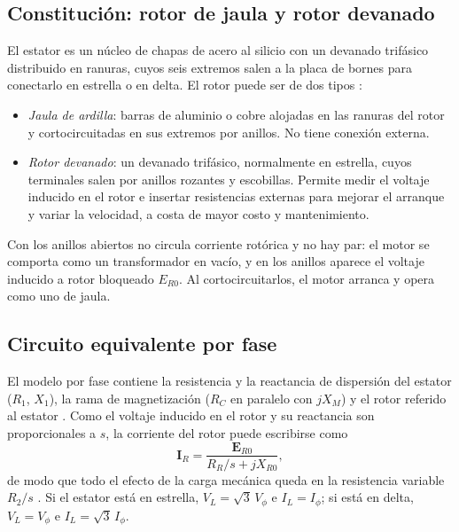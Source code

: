 \documentclass[conference]{IEEEtran}
\begin{document}
\subsection{Constitución: rotor de jaula y rotor devanado}
El estator es un núcleo de chapas de acero al silicio con un devanado trifásico distribuido en ranuras, cuyos seis extremos salen a la placa de bornes para conectarlo en estrella o en delta. El rotor puede ser de dos tipos \cite{chapman,fraile}:
\begin{itemize}
\item \emph{Jaula de ardilla}: barras de aluminio o cobre alojadas en las ranuras del rotor y cortocircuitadas en sus extremos por anillos. No tiene conexión externa.
\item \emph{Rotor devanado}: un devanado trifásico, normalmente en estrella, cuyos terminales salen por anillos rozantes y escobillas. Permite medir el voltaje inducido en el rotor e insertar resistencias externas para mejorar el arranque y variar la velocidad, a costa de mayor costo y mantenimiento.
\end{itemize}
Con los anillos abiertos no circula corriente rotórica y no hay par: el motor se comporta como un transformador en vacío, y en los anillos aparece el voltaje inducido a rotor bloqueado $E_{R0}$. Al cortocircuitarlos, el motor arranca y opera como uno de jaula.

\subsection{Circuito equivalente por fase}
El modelo por fase contiene la resistencia y la reactancia de dispersión del estator ($R_1$, $X_1$), la rama de magnetización ($R_C$ en paralelo con $jX_M$) y el rotor referido al estator \cite{chapman}. Como el voltaje inducido en el rotor y su reactancia son proporcionales a $s$, la corriente del rotor puede escribirse como
\begin{equation}
\mathbf{I}_R=\frac{\mathbf{E}_{R0}}{R_R/s+jX_{R0}},
\label{eq:ir}
\end{equation}
de modo que todo el efecto de la carga mecánica queda en la resistencia variable $R_2/s$ \cite{diapositivas}. Si el estator está en estrella, $V_L=\sqrt3\,V_\phi$ e $I_L=I_\phi$; si está en delta, $V_L=V_\phi$ e $I_L=\sqrt3\,I_\phi$.
\end{document}
